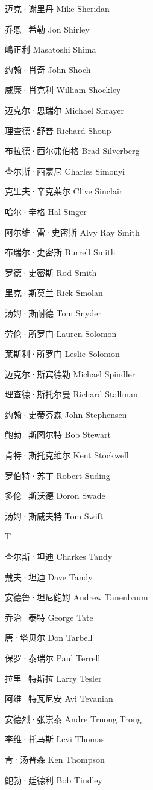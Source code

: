 \documentclass[12pt,UTF8]{ctexbook}
\begin{document}
迈克·谢里丹 Mike Sheridan

乔恩·希勒 Jon Shirley

嶋正利 Masatoshi Shima

约翰·肖奇 John Shoch

威廉·肖克利 William Shockley

迈克尔·思瑞尔 Michael Shrayer

理查德·舒普 Richard Shoup

布拉德·西尔弗伯格 Brad Silverberg

查尔斯·西蒙尼 Charles Simonyi

克里夫·辛克莱尔 Clive Sinclair

哈尔·辛格 Hal Singer

阿尔维·雷·史密斯 Alvy Ray Smith

布瑞尔·史密斯 Burrell Smith

罗德·史密斯 Rod Smith

里克·斯莫兰 Rick Smolan

汤姆·斯耐德 Tom Snyder

劳伦·所罗门 Lauren Solomon

莱斯利·所罗门 Leslie Solomon

迈克尔·斯宾德勒 Michael Spindler

理查德·斯托尔曼 Richard Stallman

约翰·史蒂芬森 John Stephensen

鲍勃·斯图尔特 Bob Stewart

肯特·斯托克维尔 Kent Stockwell

罗伯特·苏丁 Robert Suding

多伦·斯沃德 Doron Swade

汤姆·斯威夫特 Tom Swift

T

查尔斯·坦迪 Charkes Tandy

戴夫·坦迪 Dave Tandy

安德鲁·坦尼鲍姆 Andrew Tanenbaum

乔治·泰特 George Tate

唐·塔贝尔 Don Tarbell

保罗·泰瑞尔 Paul Terrell

拉里·特斯拉 Larry Tesler

阿维·特瓦尼安 Avi Tevanian

安德烈·张崇泰 Andre Truong Trong

李维·托马斯 Levi Thomas

肯·汤普森 Ken Thompson

鲍勃·廷德利 Bob Tindley
\end{document}
